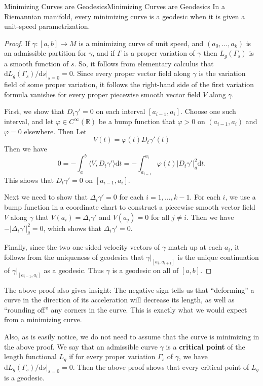 \documentclass[../main.tex]{subfiles}
\begin{document}
\begin{theorem}{Minimizing Curves are Geodesics}{Minimizing Curves are Geodesics}
  In a Riemannian manifold, every minimizing curve is a geodesic when it is given a unit-speed parametrization.
\end{theorem}
\begin{proof}
  If $\gamma: [a,b] \to M$ is a minimizing curve of unit speed, and $(a_0, \ldots, a_k)$ is an admissible partition for $\gamma$, and if $\Gamma$ is a proper variation of $\gamma$ then $L_g(\Gamma_s)$ is a smooth function of $s$. So, it follows from elementary calculus that $\mathrm{d} L_g(\Gamma_s)/\mathrm{d} s|_{s=0} = 0$. Since every proper vector field along $\gamma$ is the variation field of some proper variation, it follows the right-hand side of the first variation formula vanishes for every proper piecewise smooth vector field $V$ along $\gamma$.

  \medskip
  First, we show that $D_t \gamma' = 0$ on each interval $[a_{i-1}, a_i]$. Choose one such interval, and let $\varphi \in C^{\infty}(\mathbb{R})$ be a bump function that $\varphi > 0$ on $(a_{i-1}, a_i)$ and $\varphi = 0$ elsewhere. Then Let
  \begin{equation}
    V(t) = \varphi(t) D_t \gamma'(t)
  \end{equation}
  Then we have
  \begin{equation}
    0 = -\int_a^b \langle V, D_t \gamma' \rangle \mathrm{d} t = -\int_{a_{i-1}}^{a_i} \varphi(t) |D_t \gamma'|_g^2 \mathrm{d} t.
  \end{equation}
  This shows that $D_t \gamma' = 0$ on $[a_{i-1}, a_i]$.

  \medskip
  Next we need to show that $\Delta_i \gamma' = 0$ for each $i = 1, \ldots, k-1$. For each $i$, we use a bump function in a coordinate chart to construct a piecewise smooth vector field $V$ along $\gamma$ that $V(a_i) = \Delta_i \gamma'$ and $V(a_j) = 0$ for all $j \neq i$. Then we have $-|\Delta_i \gamma'|_g^2 = 0$, which shows that $\Delta_i \gamma' = 0$.

  Finally, since the two one-sided velocity vectors of $\gamma$ match up at each $a_i$, it follows from the uniqueness of geodesics that $\gamma|_{[a_i, a_{i+1}]}$ is the unique continuation of $\gamma|_{[a_{i-1}, a_i]}$ as a geodesic. Thus $\gamma$ is a geodesic on all of $[a,b]$.
\end{proof}

\begin{remark}
  The above proof also gives insight: The negative sign tells us that ``deforming'' a curve in the direction of its acceleration will decrease its length, as well as ``rounding off'' any corners in the curve. This is exactly what we would expect from a minimizing curve.

  \medskip
  Also, as is easily notice, we do not need to assume that the curve is minimizing in the above proof. We say that an admissible curve $\gamma$ is a \textbf{critical point} of the length functional $L_g$ if for every proper variation $\Gamma_s$ of $\gamma$, we have $\mathrm{d} L_g(\Gamma_s)/\mathrm{d} s|_{s=0} = 0$. Then the above proof shows that every critical point of $L_g$ is a geodesic.
\end{remark}
\end{document}
